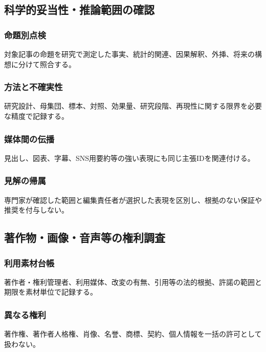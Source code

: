 \documentclass[a4paper,11pt]{article}
\begin{document}
\subsection{科学的妥当性・推論範囲の確認}
\subsubsection{命題別点検}
\par 対象記事の命題を研究で測定した事実、統計的関連、因果解釈、外挿、将来の構想に分けて照合する。\par\medskip
\subsubsection{方法と不確実性}
\par 研究設計、母集団、標本、対照、効果量、研究段階、再現性に関する限界を必要な精度で記録する。\par\medskip
\subsubsection{媒体間の伝播}
\par 見出し、図表、字幕、SNS用要約等の強い表現にも同じ主張IDを関連付ける。\par\medskip
\subsubsection{見解の帰属}
\par 専門家が確認した範囲と編集責任者が選択した表現を区別し、根拠のない保証や推奨を付与しない。\par\medskip
\subsection{著作物・画像・音声等の権利調査}
\subsubsection{利用素材台帳}
\par 著作者・権利管理者、利用媒体、改変の有無、引用等の法的根拠、許諾の範囲と期限を素材単位で記録する。\par\medskip
\subsubsection{異なる権利}
\par 著作権、著作者人格権、肖像、名誉、商標、契約、個人情報を一括の許可として扱わない。\par\medskip
\end{document}

